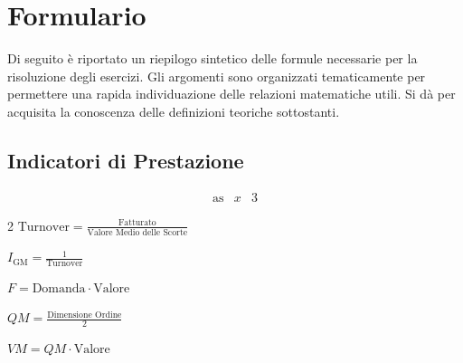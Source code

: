 \clearpage
\section*{Formulario}
Di seguito è riportato un riepilogo sintetico delle formule necessarie per la risoluzione degli esercizi. Gli argomenti sono organizzati tematicamente per permettere una rapida individuazione delle relazioni matematiche utili. Si dà per acquisita la conoscenza delle definizioni teoriche sottostanti.
%
\subsection*{Indicatori di Prestazione}

\[
    \begin{array}{lcr}
        \text{as} & x & 3
    \end{array}
\]
\begin{multicols}{2}
     \quad
    $ \text{Turnover} = \frac{\text{Fatturato}}{\text{Valore Medio delle Scorte}} $

     \quad $ I_{\text{GM}} = \frac{1}{\text{Turnover}} $

     \quad $ F = \text{Domanda} \cdot \text{Valore} $

     \quad $ QM = \frac{\text{Dimensione Ordine}}{2} $

     \quad $ VM = QM \cdot \text{Valore} $
\end{multicols}

